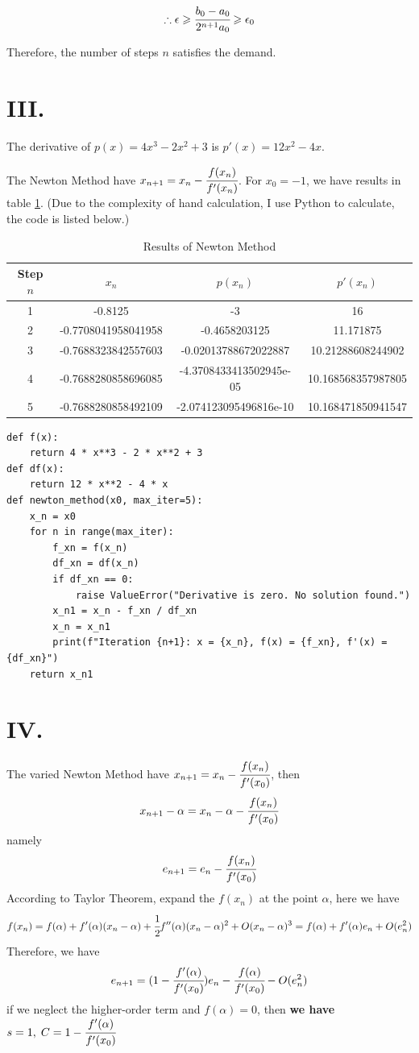 \documentclass[a4paper]{article}
\begin{document}
\[
\therefore \epsilon \geqslant \cfrac{b_0 - a_0}{2^{n+1}a_0} \geqslant \epsilon_0
\]

Therefore, the number of steps $n$ satisfies the demand.

\section*{III.}
The derivative of $p(x) = 4x^3 - 2x^2 + 3$ is $p'(x) = 12x^2 -4x$.

The Newton Method have $x_{n+1} = x_n - \cfrac{f(x_n)}{f'(x_n)}$. For $x_0 = -1$, we have results in table \ref{tab:III}.
(Due to the complexity of hand calculation, I use Python to calculate, the code is listed below.)
\begin{table}[h]
\centering  
\begin{tabular}{|c|c|c|c|}
\hline
Step $n$ & $x_n$ & $p(x_n)$ & $p'(x_n)$\\
\hline
1 & -0.8125 & -3 & 16 \\
2 & -0.7708041958041958 & -0.4658203125 & 11.171875 \\
3 & -0.7688323842557603 & -0.02013788672022887 & 10.21288608244902 \\
4 & -0.7688280858696085 & -4.3708433413502945e-05 & 10.168568357987805 \\
5 & -0.7688280858492109 & -2.074123095496816e-10 & 10.168471850941547 \\
\hline
\end{tabular}
\caption{Results of Newton Method}
\label{tab:III}
\end{table}

\begin{tcolorbox}[title=Python code for Newton Method]
\begin{verbatim}
def f(x):
    return 4 * x**3 - 2 * x**2 + 3
def df(x):
    return 12 * x**2 - 4 * x
def newton_method(x0, max_iter=5):
    x_n = x0
    for n in range(max_iter):
        f_xn = f(x_n)
        df_xn = df(x_n)
        if df_xn == 0:
            raise ValueError("Derivative is zero. No solution found.")
        x_n1 = x_n - f_xn / df_xn
        x_n = x_n1
        print(f"Iteration {n+1}: x = {x_n}, f(x) = {f_xn}, f'(x) = {df_xn}")
    return x_n1
\end{verbatim}
\end{tcolorbox}

\section*{IV.}
The varied Newton Method have $x_{n+1} = x_n - \cfrac{f(x_n)}{f'(x_0)}$, then
\[
x_{n+1} -\alpha = x_n - \alpha - \cfrac{f(x_n)}{f'(x_0)}
\]
namely
\[
e_{n+1} = e_n - \cfrac{f(x_n)}{f'(x_0)}
\]
According to Taylor Theorem, expand the $f(x_n)$ at the point $\alpha$, here we have 
\[
f(x_n) = f(\alpha) + f'(\alpha)(x_n - \alpha) + \cfrac{1}{2}f''(\alpha)(x_n - \alpha)^2 + O(x_n - \alpha)^3 
=f(\alpha) + f'(\alpha)e_n + O(e_n^2)
\]
Therefore, we have
\[
e_{n+1} = (1 - \cfrac{f'(\alpha)}{f'(x_0)})e_n - \cfrac{f(\alpha)}{f'(x_0)} - O(e_n^2)
\]
if we neglect the higher-order term and $f(\alpha) = 0$, then \textbf{we have $s = 1,\; C = 1 - \cfrac{f'(\alpha)}{f'(x_0)}$}
\newpage
\end{document}
